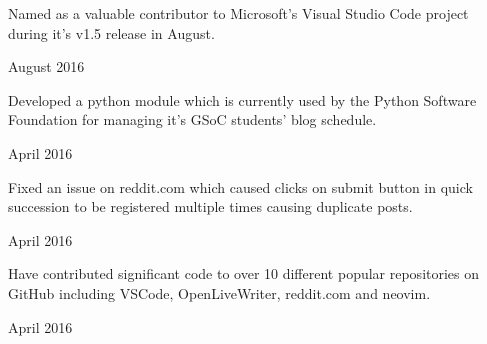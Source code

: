 
\begin{cvachievements}

\cvachievement%
  {%
    \begin{cvachievementitems}
      \item{Named as a valuable contributor to Microsoft's Visual Studio Code
            project during it's v1.5 release in August.} %
    \end{cvachievementitems}
  }
  {August 2016} %

\cvachievement%
  {%
    \begin{cvachievementitems}
      \item{Developed a python module which is currently used by the Python
            Software Foundation for managing it's GSoC students' blog schedule.} %
    \end{cvachievementitems}
  }
  {April 2016} %

\cvachievement%
  {%
    \begin{cvachievementitems}
      \item{Fixed an issue on reddit.com which caused clicks on submit button in
            quick succession to be registered multiple times causing duplicate
            posts.} %
    \end{cvachievementitems}
  }
  {April 2016} %

\cvachievement%
  {%
    \begin{cvachievementitems}
      \item{Have contributed significant code to over 10 different popular
            repositories on GitHub including VSCode, OpenLiveWriter, reddit.com
            and neovim.} %
    \end{cvachievementitems}
  }
  {April 2016} %

\end{cvachievements}
